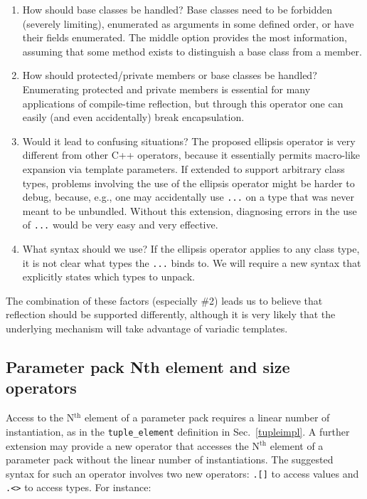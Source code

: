 \documentclass{article}
\begin{document}
\begin{enumerate}
\item How should base classes be handled? Base classes need to be
  forbidden (severely limiting), enumerated as arguments in some
  defined order, or have their fields enumerated. The middle option
  provides the most information, assuming that some method exists to
  distinguish a base class from a member.

\item How should protected/private members or base classes be
  handled? Enumerating protected and private members is essential for
  many applications of compile-time reflection, but through this
  operator one can easily (and even accidentally) break
  encapsulation. 
  
\item Would it lead to confusing situations? The proposed ellipsis
  operator is very different from other C++ operators, because it
  essentially permits macro-like expansion via template parameters. If
  extended to support arbitrary class types, problems involving the
  use of the ellipsis operator might be harder to debug, because,
  e.g., one may accidentally use \texttt{...} on a type that was never
  meant to be unbundled. Without this extension, diagnosing errors in
  the use of \texttt{...} would be very easy and very effective.

\item What syntax should we use? If the ellipsis operator applies to
  any class type, it is not clear what types the \texttt{...} binds
  to. We will require a new syntax that explicitly states which types
  to unpack.
\end{enumerate}

The combination of these factors (especially \#2) leads us to believe
that reflection should be supported differently, although it is very
likely that the underlying mechanism will take advantage of variadic
templates. 

\subsection{Parameter pack Nth element and size operators}
Access to the N$^\text{th}$ element of a parameter pack requires a
linear number of instantiation, as in the \texttt{tuple\_element}
definition in Sec.~\ref{tupleimpl}. A further extension may provide a
new operator that accesses the N$^\text{th}$ element of a parameter
pack without the linear number of instantiations. The suggested syntax
for such an operator involves two new operators: \texttt{.[]} to
access values and \texttt{.<>} to access types. For instance:
\end{document}

